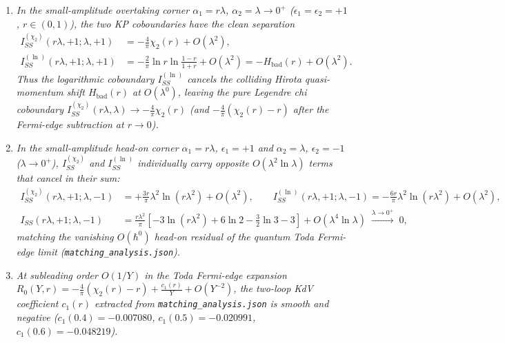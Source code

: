\documentclass[11pt,a4paper]{article}
\newcommand{\hb}{\hbar}
\begin{document}
\begin{enumerate}
\item \emph{In the small-amplitude overtaking corner $\alpha_1 = r\lambda$,
$\alpha_2 = \lambda \to 0^+$ ($\epsilon_1 = \epsilon_2 = +1$, $r \in (0,1)$), the
two KP coboundaries have the clean separation}
\begin{align}
  I_{SS}^{(\chi_2)}(r\lambda,+1;\lambda,+1)
  &= -\frac{4}{\pi}\chi_2(r) + O(\lambda^2),
  \label{eq:ISS_chi2_overtaking} \\
  I_{SS}^{(\ln)}(r\lambda,+1;\lambda,+1)
  &= -\frac{2}{\pi}\ln r\ln\frac{1-r}{1+r} + O(\lambda^2)
   = -H_{\mathrm{bad}}(r) + O(\lambda^2).
  \label{eq:ISS_ln_overtaking}
\end{align}
\emph{Thus the logarithmic coboundary $I_{SS}^{(\ln)}$ cancels the colliding
Hirota quasi-momentum shift $H_{\mathrm{bad}}(r)$ at $O(\lambda^0)$, leaving the
pure Legendre chi coboundary $I_{SS}^{(\chi_2)}(r\lambda,\lambda) \to -\frac{4}{\pi}\chi_2(r)$
(and $-\frac{4}{\pi}(\chi_2(r)-r)$ after the Fermi-edge subtraction at $r\to 0$).}
\item \emph{In the small-amplitude head-on corner $\alpha_1 = r\lambda$,
$\epsilon_1 = +1$ and $\alpha_2 = \lambda$, $\epsilon_2 = -1$ ($\lambda\to 0^+$),
$I_{SS}^{(\chi_2)}$ and $I_{SS}^{(\ln)}$ individually carry opposite
$O(\lambda^2\ln\lambda)$ terms that cancel in their sum:}
\begin{align}
  I_{SS}^{(\chi_2)}(r\lambda,+1;\lambda,-1)
  &= +\frac{3r}{\pi}\lambda^2\ln(r\lambda^2) + O(\lambda^2), \qquad
  I_{SS}^{(\ln)}(r\lambda,+1;\lambda,-1)
  = -\frac{6r}{\pi}\lambda^2\ln(r\lambda^2) + O(\lambda^2),
  \label{eq:ISS_headon_parts} \\
  I_{SS}(r\lambda,+1;\lambda,-1)
  &= \frac{r\lambda^2}{\pi}\left[-3\ln(r\lambda^2) + 6\ln 2 - \frac{3}{2}\ln 3 - 3\right] + O(\lambda^4\ln\lambda) \;\xrightarrow{\lambda\to 0^+}\; 0,
  \label{eq:ISS_headon_sum}
\end{align}
\emph{matching the vanishing $O(\hb^0)$ head-on residual of the quantum Toda
Fermi-edge limit (\texttt{matching\_analysis.json}).}
\item \emph{At subleading order $O(1/Y)$ in the Toda Fermi-edge expansion
$R_0(Y,r) = -\frac{4}{\pi}(\chi_2(r)-r) + \frac{c_1(r)}{Y} + O(Y^{-2})$, the
two-loop KdV coefficient $c_1(r)$ extracted from \texttt{matching\_analysis.json}
is smooth and negative ($c_1(0.4) = -0.007080$, $c_1(0.5) = -0.020991$,
$c_1(0.6) = -0.048219$).}
\end{enumerate}
\end{document}
